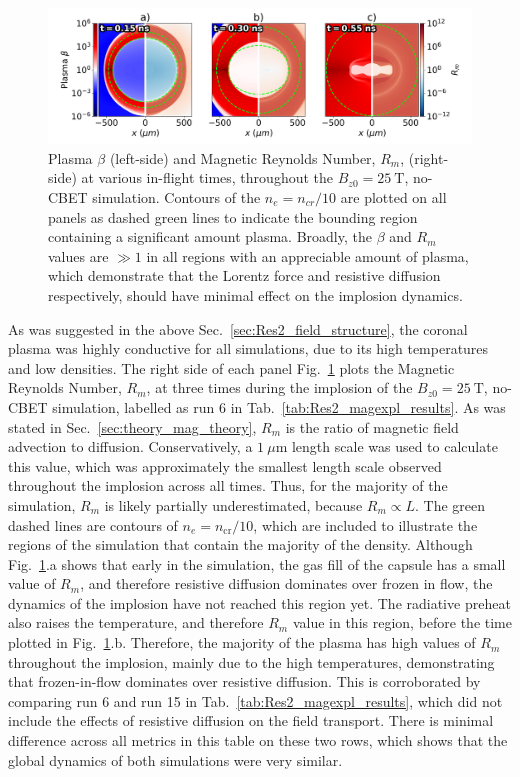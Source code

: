 \begin{figure}[t!]
    \includegraphics[width=\linewidth]{Results2/Images/magmag_beta_Rm.png}
    \centering
    \caption{Plasma $\beta$ (left-side) and Magnetic Reynolds Number, $R_m$, (right-side) at various in-flight times, throughout the $B_{z0}=25\ \text{T}$, no-\ac{CBET} simulation.
    Contours of the $n_e=n_{cr}/10$ are plotted on all panels as dashed green lines to indicate the bounding region containing a significant amount plasma.
    Broadly, the $\beta$ and $R_m$ values are $\gg 1$ in all regions with an appreciable amount of plasma, which demonstrate that the Lorentz force and resistive diffusion respectively, should have minimal effect on the implosion dynamics.}%
    \label{fig:Res2_magmag_beta_Rm}
\end{figure}

As was suggested in the above Sec.~\ref{sec:Res2_field_structure}, the coronal plasma was highly conductive for all simulations, due to its high temperatures and low densities.
The right side of each panel Fig.~\ref{fig:Res2_magmag_beta_Rm} plots the Magnetic Reynolds Number, $R_m$, at three times during the implosion of the $B_{z0}=25\ \text{T}$, no-\ac{CBET} simulation, labelled as run 6 in Tab.~\ref{tab:Res2_magexpl_results}.
As was stated in Sec.~\ref{sec:theory_mag_theory}, $R_m$ is the ratio of magnetic field advection to diffusion.
Conservatively, a $1\ \mu\text{m}$ length scale was used to calculate this value, which was approximately the smallest length scale observed throughout the implosion across all times.
Thus, for the majority of the simulation, $R_m$ is likely partially underestimated, because $R_m\propto L$.
The green dashed lines are contours of $n_e=n_{\text{cr}}/10$, which are included to illustrate the regions of the simulation that contain the majority of the density.
Although Fig.~\ref{fig:Res2_magmag_beta_Rm}.a shows that early in the simulation, the gas fill of the capsule has a small value of $R_m$, and therefore resistive diffusion dominates over frozen in flow, the dynamics of the implosion have not reached this region yet.
The radiative preheat also raises the temperature, and therefore $R_m$ value in this region, before the time plotted in Fig.~\ref{fig:Res2_magmag_beta_Rm}.b.
Therefore, the majority of the plasma has high values of $R_m$ throughout the implosion, mainly due to the high temperatures, demonstrating that frozen-in-flow dominates over resistive diffusion.
This is corroborated by comparing run 6 and run 15 in Tab.~\ref{tab:Res2_magexpl_results}, which did not include the effects of resistive diffusion on the field transport.
There is minimal difference across all metrics in this table on these two rows, which shows that the global dynamics of both simulations were very similar.

